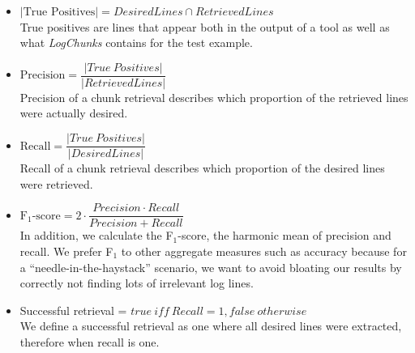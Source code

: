 \vspace{0.2cm}
\begin{itemize}[leftmargin=0.4cm] \itemsep1em
	\item $|\mbox{True\ Positives}| = \mathit{DesiredLines} \cap
	\mathit{RetrievedLines}$ \vspace{0.2cm}\\
	True positives are lines that appear both in the output of a
	tool as well as what \textit{LogChunks} contains for the
  test example.


	\item $\mbox{Precision} = \dfrac{|\mathit{True\
	Positives}|}{|\mathit{RetrievedLines}|}$ \vspace{0.21cm} \\
	Precision of a chunk retrieval describes which proportion of
	the retrieved lines were actually desired.

	\item $\mbox{Recall} =
	\dfrac{|\mathit{True\ Positives}|}{|\mathit{DesiredLines}|}$
	\vspace{0.2cm} \\
	Recall of a chunk retrieval describes which proportion of the
	desired lines were retrieved.

	\item $\mbox{F$_{1}$-score} = 2 \cdot \dfrac{\mathit{Precision}
	\cdot \mathit{Recall}}{\mathit{Precision} + \mathit{Recall}}$
	\vspace{0.2cm}\\
	In addition, we calculate the F$_{1}$-score, the harmonic mean
	of precision and recall.
  We prefer F$_{1}$ to other aggregate
	measures such as accuracy because for a
	``needle-in-the-haystack'' scenario, we want to avoid bloating
	our results by correctly not finding lots of irrelevant log
	lines.

	\item Successful retrieval = $\mathit{true}\ \mathit{iff}\
	\mathit{Recall} = 1, \mathit{false\ otherwise}$ \vspace{0.05cm}\\
	We define a successful retrieval as one where all desired
	lines were
	extracted, therefore when recall is one.
\end{itemize}

